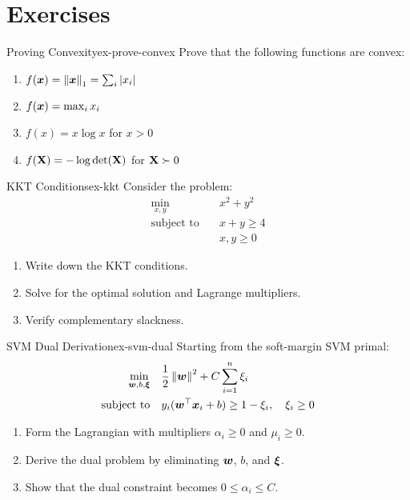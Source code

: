 \documentclass[../../main.tex]{subfiles}
\begin{document}
\section{Exercises}
\label{sec:convex-exercises}

\begin{exercise}{Proving Convexity}{ex-prove-convex}
Prove that the following functions are convex:
\begin{enumerate}[label=(\alph*)]
    \item $f(\boldsymbol{x}) = \left\lVert \boldsymbol{x} \right\rVert_1 = \sum_i |x_i|$
    \item $f(\boldsymbol{x}) = \max_i x_i$
    \item $f(x) = x \log x$ for $x > 0$
    \item $f(\mathbf{X}) = -\log\det(\mathbf{X})$ for $\mathbf{X} \succ 0$
\end{enumerate}
\end{exercise}

\begin{exercise}{KKT Conditions}{ex-kkt}
Consider the problem:
\begin{align*}
    \min_{x,y} \quad & x^2 + y^2 \\
    \text{subject to} \quad & x + y \geq 4 \\
    & x, y \geq 0
\end{align*}
\begin{enumerate}[label=(\alph*)]
    \item Write down the KKT conditions.
    \item Solve for the optimal solution and Lagrange multipliers.
    \item Verify complementary slackness.
\end{enumerate}
\end{exercise}

\begin{exercise}{SVM Dual Derivation}{ex-svm-dual}
Starting from the soft-margin SVM primal:
\begin{align*}
    \min_{\boldsymbol{w}, b, \boldsymbol{\xi}} \quad & \frac{1}{2}\left\lVert \boldsymbol{w} \right\rVert^2 + C\sum_{i=1}^n \xi_i \\
    \text{subject to} \quad & y_i(\boldsymbol{w}^\top \boldsymbol{x}_i + b) \geq 1 - \xi_i, \quad \xi_i \geq 0
\end{align*}
\begin{enumerate}[label=(\alph*)]
    \item Form the Lagrangian with multipliers $\alpha_i \geq 0$ and $\mu_i \geq 0$.
    \item Derive the dual problem by eliminating $\boldsymbol{w}$, $b$, and $\boldsymbol{\xi}$.
    \item Show that the dual constraint becomes $0 \leq \alpha_i \leq C$.
\end{enumerate}
\end{exercise}
\end{document}
